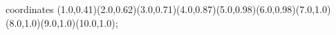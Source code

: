 					coordinates { (1.0,0.41)(2.0,0.62)(3.0,0.71)(4.0,0.87)(5.0,0.98)(6.0,0.98)(7.0,1.0)(8.0,1.0)(9.0,1.0)(10.0,1.0)};